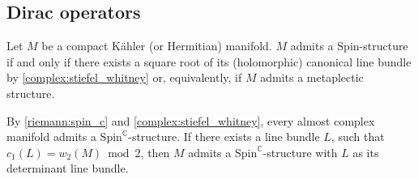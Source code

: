 
\subsection{Dirac operators}\label{section:kahler_dirac_operator}

    \begin{property}
        Let $M$ be a compact K\"ahler (or Hermitian) manifold. $M$ admits a $\mathrm{Spin}$-structure if and only if there exists a square root of its (holomorphic) canonical line bundle by \cref{complex:stiefel_whitney} or, equivalently, if $M$ admits a metaplectic structure.
    \end{property}

    \begin{property}
        By \cref{riemann:spin_c} and \cref{complex:stiefel_whitney}, every almost complex manifold admits a $\mathrm{Spin}^{\mathbb{C}}$-structure. If there exists a line bundle $L$, such that $c_1(L)=w_2(M)\bmod2$, then $M$ admits a $\mathrm{Spin}^{\mathbb{C}}$-structure with $L$ as its determinant line bundle.
    \end{property}

